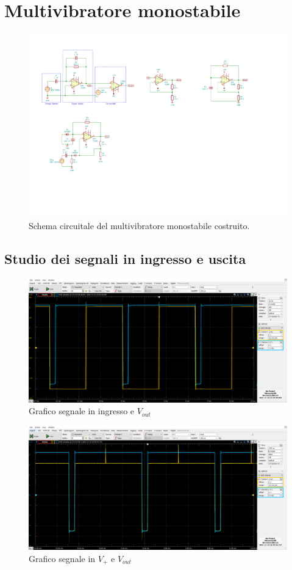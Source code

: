 \documentclass[10pt,a4paper]{article}
\begin{document}
\section{Multivibratore monostabile}
\begin{figure}[htbp]
    \centering
	\includegraphics[scale=1.2]{monostable}
    \caption{Schema circuitale del multivibratore monostabile costruito.
    \label{fig: monostableschm}}
\end{figure}

\subsection{Studio dei segnali in ingresso e uscita}
\begin{figure}[htbp]
\centering
\includegraphics[scale=0.42]{monostabile}
\caption{Grafico segnale in ingresso e $V_{out}$}
\end{figure}

\begin{figure}[htbp]
\centering
\includegraphics[scale=0.42]{monostabileV+}
\caption{Grafico segnale in $V_+$ e $V_{out}$}
\end{figure}
\end{document}
